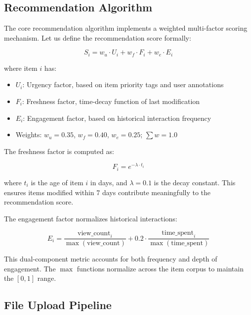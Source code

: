 \documentclass[10pt,twocolumn,a4paper]{article}
\begin{document}
\subsection{Recommendation Algorithm}

The core recommendation algorithm implements a weighted multi-factor scoring mechanism. Let us
define the recommendation score formally:

\begin{equation}
  S_i = w_u \cdot U_i + w_f \cdot F_i + w_e \cdot E_i
  \label{eq:score_detailed}
\end{equation}

\noindent where item $i$ has:
\begin{itemize}
  \item $U_i$: Urgency factor, based on item priority tags and user annotations
  \item $F_i$: Freshness factor, time-decay function of last modification
  \item $E_i$: Engagement factor, based on historical interaction frequency
  \item Weights: $w_u = 0.35$, $w_f = 0.40$, $w_e = 0.25$; $\sum w = 1.0$
\end{itemize}

The freshness factor is computed as:

\begin{equation}
  F_i = e^{-\lambda \cdot t_i}
  \label{eq:freshness}
\end{equation}

\noindent where $t_i$ is the age of item $i$ in days, and $\lambda = 0.1$ is the decay constant.
This ensures items modified within 7 days contribute meaningfully to the recommendation score.

The engagement factor normalizes historical interactions:

\begin{equation}
  E_i = \frac{\text{view\_count}_i}{\max(\text{view\_count})} + 0.2 \cdot \frac{\text{time\_spent}_i}{\max(\text{time\_spent})}
  \label{eq:engagement}
\end{equation}

\noindent This dual-component metric accounts for both frequency and depth of engagement. The
$\max$ functions normalize across the item corpus to maintain the $[0,1]$ range.

\subsection{File Upload Pipeline}
\end{document}
